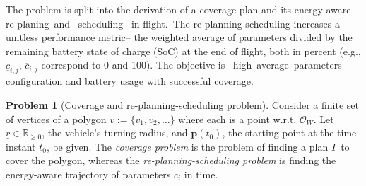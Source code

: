 \documentclass[letterpaper,10pt,conference,twoside]{IEEEtran}
\theoremstyle{definition}
\newtheorem*{pb}{Problem}%
\begin{document}
The problem %
is {\color{black}split into }%
{\color{black}the derivation }%
{\color{black} of} a {\color{black}coverage} plan %
{\color{black}and its} {\color{black}energy-aware} %
re-plan{\color{black}ing}~and~-schedul{\color{black}ing~}%
in-flight.~The %
{\color{black} 
re-planning-scheduling increases a unitless performance metric--%
the weighted average of parameters divided by the remaining battery state of charge (SoC) at the end of flight, both in percent (e.g., $\underline{c}_{i,j}$, $\overline{c}_{i,j}$ correspond to 0 and 100). The objective is~%
high~average~parameters configuration and battery usage with successful %
coverage.
}

\begin{pb}[Coverage and re-planning-scheduling problem]
  \label{pb:cov-pb}
  Consider a finite set of vertices of a polygon $v:=\{v_1,v_2,\dots\}$ where each %
  is a point w.r.t. $\mathcal{O}_W$. 
  Let $\underline{r}\in\mathbb{R}_{\geq 0}$, the vehicle's turning radius, and $\mathbf{p}(t_0)$, the starting point at the time instant $t_0$, be given. 
  The \emph{coverage problem} is the problem of finding a plan $\Gamma$ to cover the polygon, whereas the \emph{re-planning-scheduling problem} is finding the {\color{black}energy-aware} trajectory of parameters $c_i$ in time{\color{black}.}%
\end{pb}    


\end{document}
